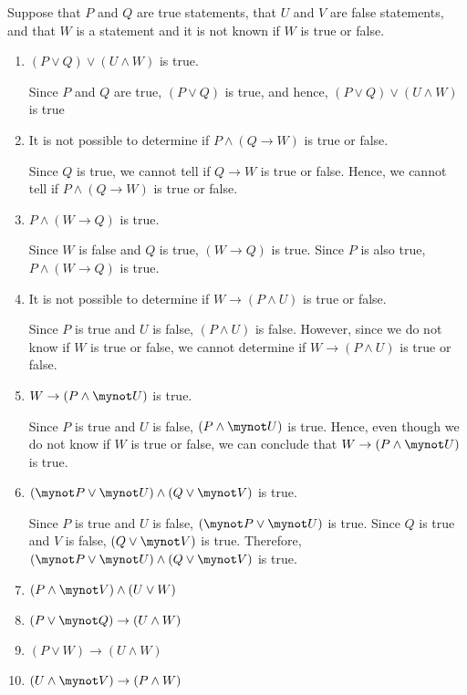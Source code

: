 \documentclass[11pt]{article}
\begin{document}
\vskip20pt
\noindent
Suppose that $P$ and $Q$ are true statements, that $U$ and $V$ are false statements, and that $W$ is a statement and it is not known if $W$ is true or false.

\begin{enumerate}
  \item $(P \vee Q) \vee (U \wedge W)$ is true.

Since $P$ and $Q$ are true, $(P \vee Q)$ is true, and hence, $(P \vee Q) \vee (U \wedge W)$ is true

  \item It is not possible to determine if $P \wedge (Q \to W)$ is true or false.

Since $Q$ is true, we cannot tell if $Q \to W$ is true or false.  Hence, we cannot tell if $P \wedge (Q \to W)$ is true or false.
  \item $P \wedge (W \to Q)$ is true.

Since $W$ is false and $Q$ is true, $(W \to Q)$ is true.  Since $P$ is also true, $P \wedge (W \to Q)$ is true.
  \item It is not possible to determine if $W \to (P \wedge U)$ is true or false.

Since $P$ is true and $U$ is false, $(P \wedge U)$ is false.  However, since we do not know if $W$ is true or false, we cannot determine if $W \to (P \wedge U)$ is true or false.
  \item $W \to (P \wedge \mynot U)$ is true.

Since $P$ is true and $U$ is false, $(P \wedge \mynot U)$ is true.  Hence, even though we do not know if $W$ is true or false, we can conclude that $W \to (P \wedge \mynot U)$ is true.

  \item $(\mynot P \vee \mynot U) \wedge (Q \vee \mynot V)$ is true.

Since $P$ is true and $U$ is false, $(\mynot P \vee \mynot U)$ is true.  Since $Q$ is true and $V$ is false, 
$(Q \vee \mynot V)$ is true.  Therefore, $(\mynot P \vee \mynot U) \wedge (Q \vee \mynot V)$ is true.

  \item $(P \wedge \mynot V) \wedge (U \vee W)$
  \item $(P \vee \mynot Q) \to (U \wedge W)$
  \item $(P \vee W) \to (U \wedge W)$
  \item $(U \wedge \mynot V) \to (P \wedge W)$

\end{enumerate}
\end{document}

